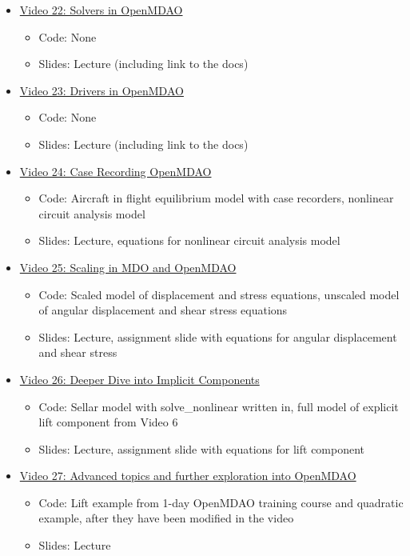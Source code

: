 \documentclass[12pt, letterpaper]{article}
\begin{document}
\begin{itemize}
	\item \underline{Video 22: Solvers in OpenMDAO} 
		\begin{itemize}
			\item Code: None
			\item Slides: Lecture (including link to the docs)
		\end{itemize}
		
	\item \underline{Video 23: Drivers in OpenMDAO}
		\begin{itemize}
			\item Code: None
			\item Slides: Lecture (including link to the docs)
		\end{itemize}

	\item \underline{Video 24: Case Recording OpenMDAO} 
		\begin{itemize}
			\item Code: Aircraft in flight equilibrium model with case recorders, nonlinear circuit analysis model
			\item Slides: Lecture, equations for nonlinear circuit analysis model
		\end{itemize}
		
	\item \underline{Video 25: Scaling in MDO and OpenMDAO} 
		\begin{itemize}
			\item Code: Scaled model of displacement and stress equations, unscaled model of angular displacement and shear stress equations
			\item Slides: Lecture, assignment slide with equations for angular displacement and shear stress
		\end{itemize}
		
	\item \underline{Video 26: Deeper Dive into Implicit Components} 
		\begin{itemize}
			\item Code: Sellar model with solve\_nonlinear written in, full model of explicit lift component from Video 6
			\item Slides: Lecture, assignment slide with equations for lift component
		\end{itemize}

	\item \underline{Video 27: Advanced topics and further exploration into OpenMDAO} 
		\begin{itemize}
			\item Code: Lift example from 1-day OpenMDAO training course and quadratic example, after they have been modified in the video
			\item Slides: Lecture
		\end{itemize}
	
\end{itemize}
\end{document}
